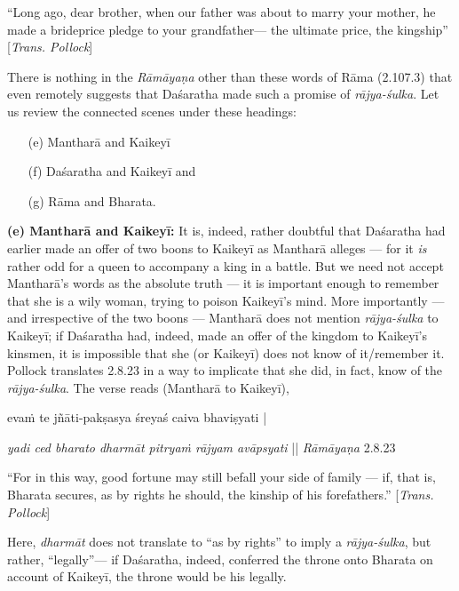 \newpage

\begin{myquote}
“Long ago, dear brother, when our father was about to marry your mother, he made a brideprice pledge to your grandfather--- the ultimate price, the kingship” [{\sl Trans. Pollock}]
\end{myquote}

There is nothing in the {\sl Rāmāyaṇa} other than these words of Rāma (2.107.3) that even remotely suggests that Daśaratha made such a promise of {\sl rājya-śulka}. Let us review the connected scenes under these headings: 
\begin{itemize}
\item[(e)] Mantharā and Kaikeyī 
\item[(f)] Daśaratha and Kaikeyī and 
\item[(g)] Rāma and Bharata.
\end{itemize}

\noindent
\textbf{(e) Mantharā and Kaikeyī:} It is, indeed, rather doubtful that Daśaratha had earlier made an offer of two boons to Kaikeyī as Mantharā alleges --- for it {\sl is} rather odd for a queen to accompany a king in a battle. But we need not accept Mantharā’s words as the absolute truth --- it is important enough to remember that she is a wily woman, trying to poison Kaikeyī’s mind.  More importantly --- and irrespective of the two boons --- Mantharā does not mention {\sl rājya-śulka} to Kaikeyī; if Daśaratha had, indeed, made an offer of the kingdom to Kaikeyī’s kinsmen, it is impossible that she (or Kaikeyī) does not know of it/remember it. Pollock translates 2.8.23 in a way to implicate that she did, in fact, know of the {\sl rājya-śulka}. The verse reads (Mantharā to Kaikeyī), 

\begin{myquote}
{{\rm evaṁ te jñāti-pakṣasya śreyaś caiva bhaviṣyati}} |

{\sl yadi ced bharato dharmāt pitryaṁ rājyam avāpsyati} || {\sl Rāmāyaṇa} 2.8.23
\end{myquote}

\begin{myquote}
 “For in this way, good fortune may still befall your side of family --- if, that is, Bharata secures, as by rights he should, the kinship of his forefathers.” [{\sl Trans. Pollock}]
\end{myquote}

Here, {\sl dharmāt} does not translate to “as by rights” to imply a {\sl rājya-śulka}, but rather, “legally”--- if Daśaratha, indeed, conferred the throne onto Bharata on account of Kaikeyī, the throne would be his legally. 

